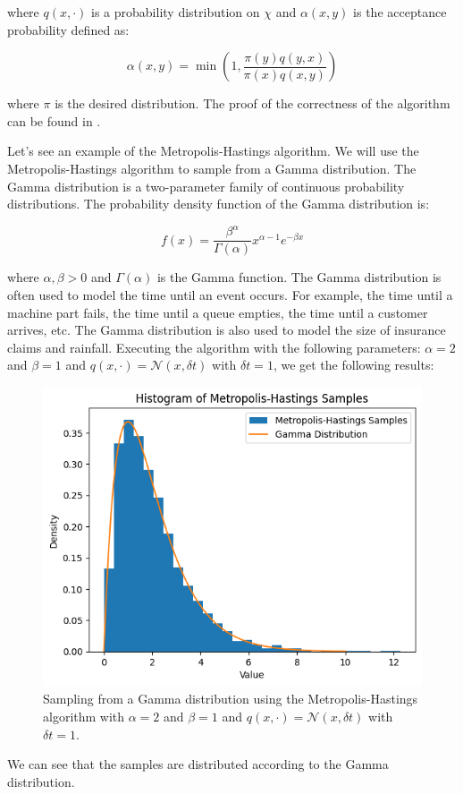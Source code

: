 \documentclass{article}
\begin{document}
where $q(x, \cdot)$ is a probability distribution on $\chi$ and $\alpha(x,y)$ is the acceptance probability defined as:

\[
	\alpha(x,y) = \min \left(1, \frac{\pi(y) q(y,x)}{\pi(x) q(x,y)} \right)
\]

where $\pi$ is the desired distribution. The proof of the correctness of the algorithm can be found in \cite{wiki:metropolishastings}.


Let's see an example of the Metropolis-Hastings algorithm. We will use the Metropolis-Hastings algorithm to sample from a Gamma distribution. The Gamma distribution is a two-parameter family of continuous probability distributions. The probability density function of the Gamma distribution is:

\[
	f(x) = \frac{\beta^\alpha}{\Gamma(\alpha)} x^{\alpha - 1} e^{-\beta x}
\]

where $\alpha, \beta > 0$ and $\Gamma(\alpha)$ is the Gamma function. The Gamma distribution is often used to model the time until an event occurs. For example, the time until a machine part fails, the time until a queue empties, the time until a customer arrives, etc. The Gamma distribution is also used to model the size of insurance claims and rainfall. Executing the algorithm with the following parameters: $\alpha = 2$ and $\beta = 1$ and $q(x, \cdot) = \mathcal{N}(x, \delta t)$ with $\delta t = 1$, we get the following results:

\begin{figure}[H]
	\centering
	\includegraphics[width=0.5\linewidth]{./Figures/MCMC/gamma.png}
	\caption{Sampling from a Gamma distribution using the Metropolis-Hastings algorithm with $\alpha = 2$ and $\beta = 1$ and $q(x, \cdot) = \mathcal{N}(x, \delta t)$ with $\delta t = 1$.}
	\label{fig:gamma}
\end{figure}

We can see that the samples are distributed according to the Gamma distribution.
\end{document}
